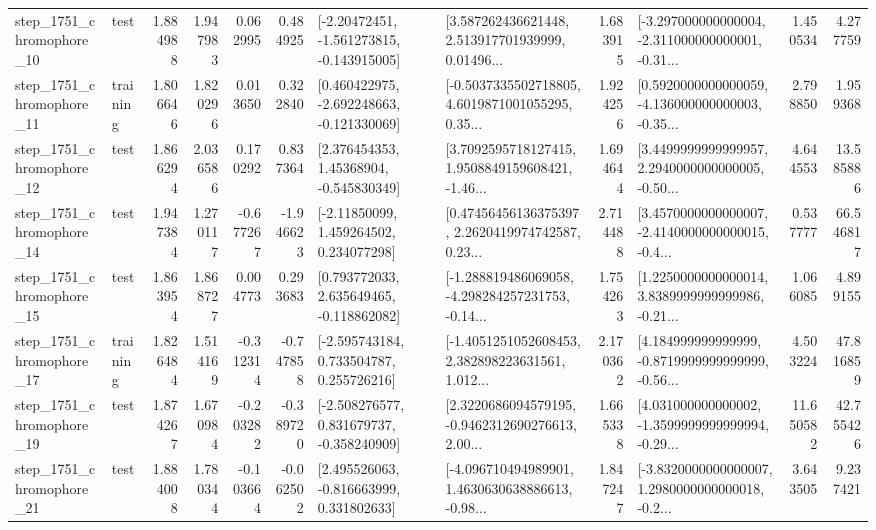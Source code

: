 \begin{tabular}{llrrrrllrlrr}
 step\_1751\_chromophore\_10 &      test &      1.884988 &    1.947983 &      0.062995 &  0.484925 &   [-2.20472451, -1.561273815, -0.143915005] &  [3.587262436621448, 2.513917701939999, 0.01496... &       1.683915 &  [-3.297000000000004, -2.311000000000001, -0.31... &            1.450534 &          4.277759 \\
 step\_1751\_chromophore\_11 &  training &      1.806646 &    1.820296 &      0.013650 &  0.322840 &   [0.460422975, -2.692248663, -0.121330069] &  [-0.5037335502718805, 4.6019871001055295, 0.35... &       1.924256 &  [0.5920000000000059, -4.136000000000003, -0.35... &            2.798850 &          1.959368 \\
 step\_1751\_chromophore\_12 &      test &      1.866294 &    2.036586 &      0.170292 &  0.837364 &     [2.376454353, 1.45368904, -0.545830349] &  [3.7092595718127415, 1.9508849159608421, -1.46... &       1.694644 &  [3.4499999999999957, 2.2940000000000005, -0.50... &            4.644553 &         13.585886 \\
 step\_1751\_chromophore\_14 &      test &      1.947384 &    1.270117 &     -0.677267 & -1.946623 &     [-2.11850099, 1.459264502, 0.234077298] &  [0.47456456136375397, 2.2620419974742587, 0.23... &       2.714488 &  [3.4570000000000007, -2.4140000000000015, -0.4... &            0.537777 &         66.546817 \\
 step\_1751\_chromophore\_15 &      test &      1.863954 &    1.868727 &      0.004773 &  0.293683 &    [0.793772033, 2.635649465, -0.118862082] &  [-1.288819486069058, -4.298284257231753, -0.14... &       1.754263 &  [1.2250000000000014, 3.8389999999999986, -0.21... &            1.066085 &          4.899155 \\
 step\_1751\_chromophore\_17 &  training &      1.826484 &    1.514169 &     -0.312314 & -0.747858 &    [-2.595743184, 0.733504787, 0.255726216] &  [-1.4051251052608453, 2.382898223631561, 1.012... &       2.170362 &  [4.184999999999999, -0.8719999999999999, -0.56... &            4.503224 &         47.816859 \\
 step\_1751\_chromophore\_19 &      test &      1.874267 &    1.670984 &     -0.203282 & -0.389720 &   [-2.508276577, 0.831679737, -0.358240909] &  [2.3220686094579195, -0.9462312690276613, 2.00... &       1.665338 &  [4.031000000000002, -1.3599999999999994, -0.29... &           11.650582 &         42.755426 \\
 step\_1751\_chromophore\_21 &      test &      1.884008 &    1.780344 &     -0.103664 & -0.062502 &    [2.495526063, -0.816663999, 0.331802633] &  [-4.096710494989901, 1.4630630638886613, -0.98... &       1.847247 &  [-3.8320000000000007, 1.2980000000000018, -0.2... &            3.643505 &          9.237421 \\

\end{tabular}
